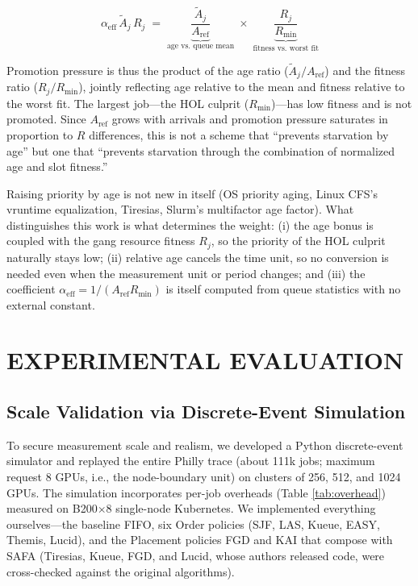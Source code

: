 \documentclass{ieeetj}
\begin{document}
\begin{equation}
\alpha_{\text{eff}}\,\tilde A_j\, R_j \;=\; \underbrace{\frac{\tilde A_j}{A_{\text{ref}}}}_{\text{age vs. queue mean}} \;\times\; \underbrace{\frac{R_j}{R_{\min}}}_{\text{fitness vs. worst fit}}
\label{eq:alphaeff-define}
\end{equation}

Promotion pressure is thus the product of the age ratio ($\tilde A_j/A_{\text{ref}}$) and the fitness ratio ($R_j/R_{\min}$), jointly reflecting age relative to the mean and fitness relative to the worst fit. The largest job---the HOL culprit ($R_{\min}$)---has low fitness and is not promoted. Since $A_{\text{ref}}$ grows with arrivals and promotion pressure saturates in proportion to $R$ differences, this is not a scheme that ``prevents starvation by age'' but one that ``prevents starvation through the combination of normalized age and slot fitness.''

Raising priority by age is not new in itself (OS priority aging, Linux CFS's vruntime equalization, Tiresias\cite{gu2019tiresias}, Slurm's multifactor age factor). What distinguishes this work is what determines the weight: (i) the age bonus is coupled with the gang resource fitness $R_j$, so the priority of the HOL culprit naturally stays low; (ii) relative age cancels the time unit, so no conversion is needed even when the measurement unit or period changes; and (iii) the coefficient $\alpha_{\text{eff}}=1/(A_{\text{ref}}R_{\min})$ is itself computed from queue statistics with no external constant.


\section{EXPERIMENTAL EVALUATION}\label{sec:eval}

\subsection{Scale Validation via Discrete-Event Simulation}\label{eval:sim}
To secure measurement scale and realism, we developed a Python discrete-event simulator and replayed the entire Philly trace\cite{jeon2019philly} (about 111k jobs; maximum request 8 GPUs, i.e., the node-boundary unit) on clusters of 256, 512, and 1024 GPUs. The simulation incorporates per-job overheads (Table \ref{tab:overhead}) measured on B200$\times$8 single-node Kubernetes. We implemented everything ourselves---the baseline FIFO, six Order policies (SJF, LAS, Kueue, EASY, Themis, Lucid), and the Placement policies FGD and KAI that compose with SAFA (Tiresias, Kueue, FGD, and Lucid, whose authors released code, were cross-checked against the original algorithms).
\end{document}
